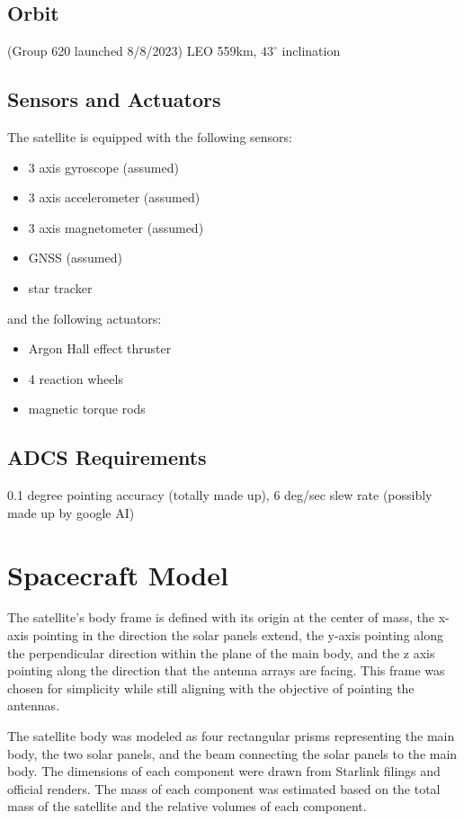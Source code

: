 \documentclass[11pt]{article}
\begin{document}
\subsection{Orbit}
(Group 620 launched 8/8/2023) LEO 559km, $43^\circ$ inclination

\subsection{Sensors and Actuators}
The satellite is equipped with the following sensors:
\begin{itemize}
\item 3 axis gyroscope (assumed)
\item 3 axis accelerometer (assumed)
\item 3 axis magnetometer (assumed)
\item GNSS (assumed)
\item star tracker
\end{itemize}

and the following actuators:
\begin{itemize}
  \item Argon Hall effect thruster
  \item 4 reaction wheels
  \item magnetic torque rods
\end{itemize}

\subsection{ADCS Requirements}
0.1 degree pointing accuracy (totally made up), 6 deg/sec slew rate (possibly made up by google AI)

\section{Spacecraft Model}
The satellite's body frame is defined with its origin at the center of mass, the x-axis pointing in the direction the solar panels extend, the y-axis pointing along the perpendicular direction within the plane of the main body, and the z axis pointing along the direction that the antenna arrays are facing. This frame was chosen for simplicity while still aligning with the objective of pointing the antennas.

The satellite body was modeled as four rectangular prisms representing the main body, the two solar panels, and the beam connecting the solar panels to the main body. The dimensions of each component were drawn from Starlink filings and official renders. The mass of each component was estimated based on the total mass of the satellite and the relative volumes of each component.
\end{document}
